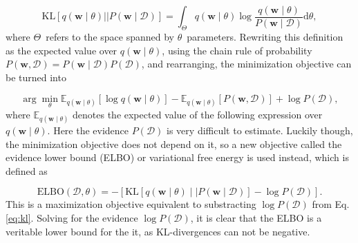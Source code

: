 	\begin{equation}
	\label{eq:kl_open}
	\mathrm{KL}\left[q(\pmb{w} \mid \theta) ||P(\pmb{w} \mid \mathcal{D})\right] = \int_{\Theta} q(\pmb{w} \mid \theta) \log \frac{q(\pmb{w} \mid \theta)}{P(\pmb{w} \mid \mathcal{D})} \mathrm{d}\theta, 
	\end{equation}
	where $\Theta$ refers to the space spanned by $\theta$ parameters. Rewriting this definition as the expected value over $q(\pmb{w} \mid \theta)$, using the chain rule of probability $P(\pmb{w},\mathcal{D}) = P(\pmb{w} \mid \mathcal{D}) P(\mathcal{D})$, and rearranging, the minimization objective can be turned into 
	
	\begin{equation}
	\label{eq:elbo_step1}
		\arg \min_{\theta}
		\mathbb{E}_{q(\pmb{w} \mid \theta)}[\log q(\pmb{w} \mid \theta)] -
		\mathbb{E}_{q(\pmb{w} \mid \theta)}[P(\pmb{w},\mathcal{D})] + 
		\log P(\mathcal{D}),
	\end{equation} 
	where $\mathbb{E}_{q(\pmb{w} \mid \theta)}$ denotes the expected value of the following expression over $q(\pmb{w} \mid \theta)$. 
	 Here the evidence $P(\mathcal{D})$ is very difficult to estimate. Luckily though, the minimization objective does not depend on it, so a new objective called the evidence lower bound (ELBO) or variational free energy is used instead, which is defined as 
	 
	 \begin{equation}
	 \label{eq:elbo_step2}
	 	\text{ELBO}(\mathcal{D}, \theta) = - \left[\mathrm{KL}\left[q(\pmb{w}\mid\theta) \mid \mid P(\pmb{w} \mid \mathcal{D})\right] - \log P(\mathcal{D})\right].
	 \end{equation}
	 This is a maximization objective equivalent to substracting $\log P(\mathcal{D})$ from Eq. \eqref{eq:kl}. Solving for the evidence $\log P(\mathcal{D})$, it is clear that the ELBO is a veritable lower bound for the it, as KL-divergences can not be negative.  

